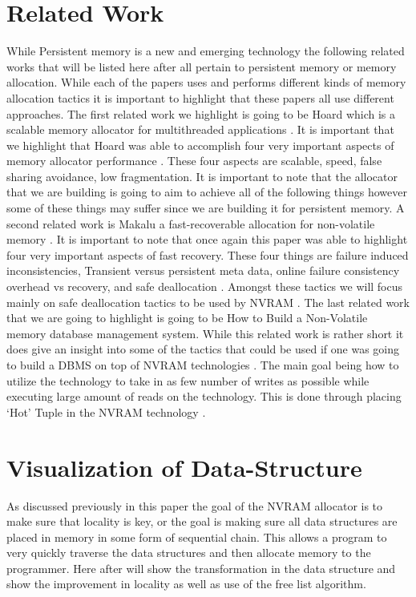 \documentclass[conference]{IEEEtran}
\begin{document}
\section{Related Work}
While Persistent memory is a new and emerging technology the following related works that will be listed here after all pertain to persistent memory or memory allocation\cite{Arulrajdbms}. While each of the papers uses and performs different kinds of memory allocation tactics it is important to highlight that these papers all use different approaches. The first related work we highlight is going to be Hoard which is a scalable memory allocator for multithreaded applications \cite{berger-asplos-2000}. It is important that we highlight that Hoard was able to accomplish four very important aspects of memory allocator performance \cite{berger-asplos-2000}\cite{DynaSOAr}. These four aspects are scalable, speed, false sharing avoidance, low fragmentation. It is important to note that the allocator that we are building is going to aim to achieve all of the following things however some of these things may suffer since we are building it for persistent memory. A second related work is Makalu a fast-recoverable allocation for non-volatile memory \cite{Makalu}\cite{Fragmentation}. It is important to note that once again this paper was able to highlight four very important aspects of fast recovery. These four things are failure induced inconsistencies, Transient versus persistent meta data, online failure consistency overhead vs recovery, and safe deallocation \cite{Makalu}. Amongst these tactics we will focus mainly on safe deallocation tactics to be used by NVRAM \cite{Makalu}. The last related work that we are going to highlight is going to be How to Build a Non-Volatile memory database management system. While this related work is rather short it does give an insight into some of the tactics that could be used if one was going to build a DBMS on top of NVRAM technologies \cite{Arulrajdbms} \cite{DynaSOAr}. The main goal being how to utilize the technology to take in as few number of writes as possible while executing large amount of reads on the technology. This is done through placing ‘Hot’ Tuple in the NVRAM technology \cite{Arulrajdbms}. 
\section{Visualization of Data-Structure} 
As discussed previously in this paper the goal of the NVRAM allocator is to make sure that locality is key, or the goal is making sure all data structures are placed in memory in some form of sequential chain. This allows a program to very quickly traverse the data structures and then allocate memory to the programmer. Here after will show the transformation in the data structure and show the improvement in locality as well as use of the free list algorithm. 
\end{document}
